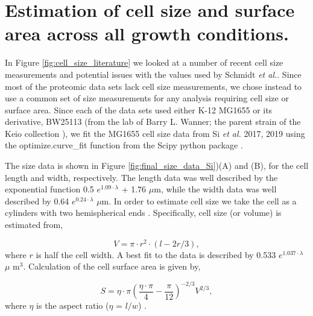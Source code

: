 \section{Estimation of cell size and surface area across all growth conditions.}

In Figure \ref{fig:cell_size_literature} we looked at a number of recent cell
size measurements and potential issues with the values used by Schmidt
\textit{et al.}. Since most of the proteomic data sets lack cell size
measurements, we chose instead to use a common set of size measurements for any
analysis requiring cell size or surface area.  Since each of the data sets used
either K-12 MG1655 or its derivative, BW25113 (from the lab of Barry L. Wanner;
the parent strain of the Keio collection \citep{datsenko2000, baba2006}), we fit
the MG1655 cell size data from Si \textit{et al.} 2017, 2019 using
the optimize.curve_fit function from the Scipy python package \citep{2020scipynmeth}.

The size data is shown in Figure \ref{fig:final_size_data_Si})(A)
and (B),  for the cell length and width, respectively. The length data was well
described by the exponential function 0.5 $e^{1.09 \cdot \lambda}$ + 1.76
$\mu$m, while the width data was well described by 0.64 $e^{0.24 \cdot \lambda}$
$\mu$m. In order to estimate cell size we take the cell as a cylinders
with two hemispherical ends \citep{si2017, basan2015}. Specifically,  cell size
(or volume) is estimated from,

\begin{equation}
V = \pi \cdot r^2 \cdot (l - 2r/3),
\label{eq:cell_size}
\end{equation}
where $r$ is half the cell width. A best fit to the data is described by 0.533
$e^{1.037 \cdot \lambda}$ $\mu$ m$^3$. Calculation of the cell surface area is
given by,

\begin{equation}
 S = \eta \cdot \pi (\frac{\eta \cdot \pi}{4} - \frac{\pi}{12})^{-2/3} V^{2/3},
\end{equation}
where $\eta$ is the aspect ratio ($\eta$ = $l/w$) \citep{ojkic2019}.

